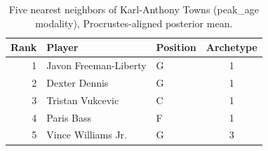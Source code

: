 \begin{table}[htbp]
  \centering\small
  \begin{tabular}{rllc}
    \toprule
    Rank & Player & Position & Archetype \\
    \midrule
    1 & Javon Freeman-Liberty & G & 1 \\
    2 & Dexter Dennis & G & 1 \\
    3 & Tristan Vukcevic & C & 1 \\
    4 & Paris Bass & F & 1 \\
    5 & Vince Williams Jr. & G & 3 \\
    \bottomrule
  \end{tabular}
  \caption{Five nearest neighbors of Karl-Anthony Towns (peak_age modality), Procrustes-aligned posterior mean.}
  \label{tab:Karl_Anthony_Towns_neighbors_peak_age}
\end{table}

